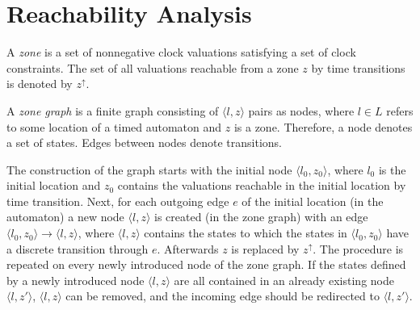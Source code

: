 \section{Reachability Analysis} \label{sec:reach}  

A \emph{zone} is a set of nonnegative clock valuations satisfying a set of clock constraints.
The set of all valuations reachable from a zone $z$ by time transitions is denoted by $z^\uparrow$.

A \emph{zone graph} is a finite graph consisting of $\langle l,z \rangle$ pairs as nodes, where $l \in L$ refers to some
location of a timed automaton and $z$ is a zone. Therefore, a node denotes a set
of states. Edges between nodes denote transitions. 

The construction of the graph starts with the initial node  $\langle l_0,z_0 \rangle$,
where $l_0$ is the initial location and $z_0$ contains the valuations reachable in the initial location by time transition. 
Next, for each outgoing edge $e$ of the initial location (in the automaton) a new node  $\langle l,z \rangle$ is created (in the zone graph) with an edge
$\langle l_0,z_0 \rangle \to \langle l,z \rangle$, where $\langle l,z \rangle$ contains the states to which the states in $\langle l_0,z_0 \rangle$ have a discrete transition through $e$. Afterwards $z$ is replaced by $z^\uparrow$.  The procedure is repeated on every newly introduced node of the zone graph. If the states defined by a newly introduced node $\langle l,z \rangle$ are all contained in an already existing node $\langle l,z' \rangle$, $\langle l,z \rangle$ can be removed, and the incoming edge should be redirected to $\langle l,z' \rangle$.


